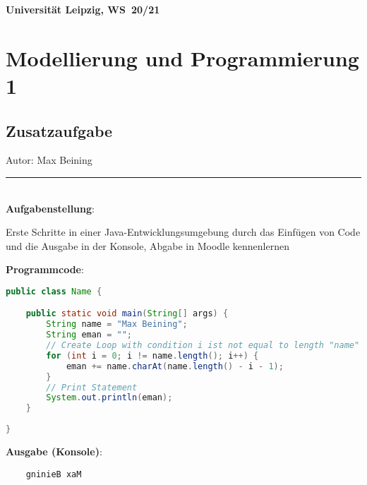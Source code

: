 \documentclass[11pt, a4paper, DIV=12]{scrartcl}
\begin{document}

\noindent
\textbf{Universität Leipzig, WS~20/21} \vspace*{-0.25cm}
\section*{Modellierung und Programmierung 1}
\subsection*{Zusatzaufgabe}
\noindent
Autor: Max Beining \\
\rule{\linewidth}{1pt} \\


\noindent
\textbf{Aufgabenstellung}: \par
\noindent
Erste Schritte in einer Java-Entwicklungsumgebung durch das Einfügen von Code und die Ausgabe in der Konsole, Abgabe in Moodle kennenlernen \par

\vspace{0.8cm}
\noindent
\textbf{Programmcode}:
\begin{small}
\begin{lstlisting}[language=Java]
public class Name {

	public static void main(String[] args) {
		String name = "Max Beining";
		String eman = "";
		// Create Loop with condition i ist not equal to length "name"
		for (int i = 0; i != name.length(); i++) {
			eman += name.charAt(name.length() - i - 1);
		}
		// Print Statement
		System.out.println(eman);
	}
	
}
\end{lstlisting}
\end{small}

\vspace{0.8cm}
\noindent
\textbf{Ausgabe (Konsole)}:
\begin{small}
\begin{lstlisting}
	gninieB xaM
\end{lstlisting}
\end{small}









\end{document}

